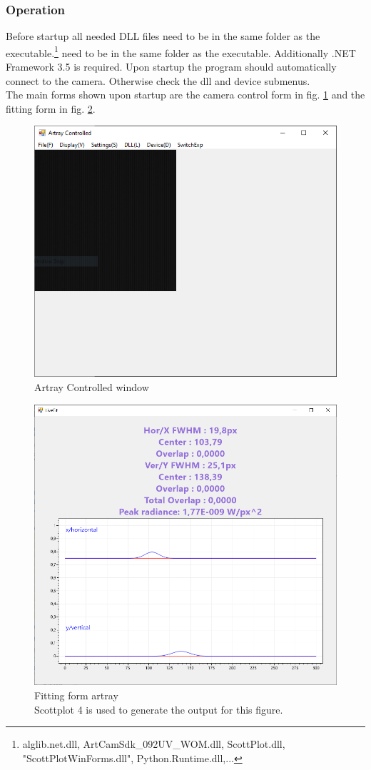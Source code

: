 \documentclass[twoside,openright]{scrreprt}
\begin{document}
{\subsubsection{Operation}
Before startup all needed DLL files need to be in the same folder as the executable.\footnote{alglib.net.dll, ArtCamSdk\_092UV\_WOM.dll, ScottPlot.dll, "ScottPlotWinForms.dll", Python.Runtime.dll,...} need to be in the same folder as the executable. Additionally .NET Framework 3.5 is required. Upon startup the program should automatically connect to the camera. Otherwise check the dll and device submenus.\\
The main forms shown upon startup are the camera control form in fig. \ref{fig:ArtrayMain} and the fitting form in fig. \ref{fig:ArtrayFitting}.

\begin{figure}[hbtp]
\centering
\includegraphics[width = 0.6\linewidth]{images/ArtrayExamplePics/ArtrayControlledMain.PNG}
\caption{Artray Controlled window\label{fig:ArtrayMain}}
\end{figure}

\begin{figure}[hbtp]
\centering
\includegraphics[width = 0.6\linewidth]{images/ArtrayExamplePics/FittingForm.PNG}
\caption{Fitting form artray\\Scottplot 4 is used to generate the output for this figure.\label{fig:ArtrayFitting}}
\end{figure}


}
\end{document}

